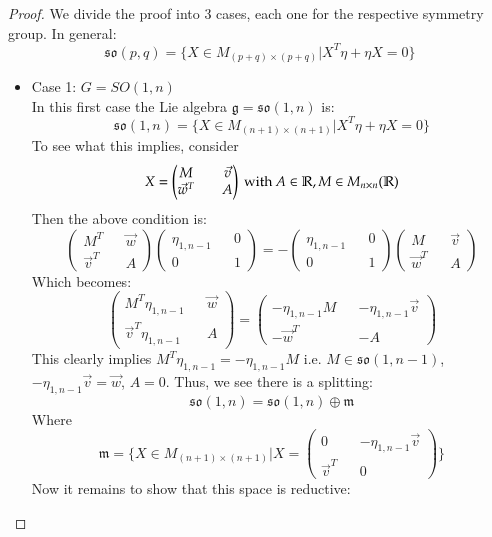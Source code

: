 \documentclass[12pt,a4paper]{report}
\theoremstyle{definition}
\theoremstyle{Theorem}
\theoremstyle{break}
\theoremstyle{definition}
\begin{document}
	\begin{proof}
		We divide the proof into 3 cases, each one for the respective symmetry group.
		In general:
		$$\mathfrak{so}(p,q)=\{X\in M_{(p+q)\times(p+q)}|X^T\eta+\eta X=0\}$$
		\begin{itemize}
			\item Case 1: $G=SO(1,n)$
			\\
			In this first case the Lie algebra $\mathfrak{g}=\mathfrak{so}(1,n)$ is:
			$$\mathfrak{so}(1,n)=\{X\in M_{(n+1)\times(n+1)}|X^T\eta+\eta X=0\}$$
			To see what this implies, consider
			$$X=\begin{pmatrix}
				M && \vec{v} \\
				\vec{w}^T && A
			\end{pmatrix}\hbox{ with }A\in\mathbb{R},M\in M_{n\times n}(\mathbb{R})$$
			Then the above condition is:
			$$\begin{pmatrix}
				M^T && \vec{w} \\
				\vec{v}^T && A
			\end{pmatrix}\begin{pmatrix}
			\eta_{1,n-1} && 0 \\
			0 && 1
			\end{pmatrix}=-\begin{pmatrix}
			\eta_{1,n-1} && 0 \\
			0 && 1
			\end{pmatrix}\begin{pmatrix}
			M && \vec{v} \\
			\vec{w}^T && A
			\end{pmatrix}$$
			Which becomes:
			$$\begin{pmatrix}
				M^T\eta_{1,n-1} && \vec{w} \\
				\vec{v}^T\eta_{1,n-1} && A
			\end{pmatrix}=\begin{pmatrix}
			-\eta_{1,n-1}M && -\eta_{1,n-1}\vec{v} \\
			-\vec{w}^T && -A
			\end{pmatrix}$$
			This clearly implies $M^T\eta_{1,n-1}=-\eta_{1,n-1}M$ i.e. $M\in \mathfrak{so}(1,n-1)$, $-\eta_{1,n-1}\vec{v}=\vec{w}$, $A=0$. Thus, we see there is a splitting:
			$$\mathfrak{so}(1,n)=\mathfrak{so}(1,n)\oplus \mathfrak{m}$$
			Where 
			$$\mathfrak{m}=\{X\in M_{(n+1)\times (n+1)}|X=\begin{pmatrix}
				0 && -\eta_{1,n-1}\vec{v} \\
				\vec{v}^T && 0
			\end{pmatrix}\}$$
			Now it remains to show that this space is reductive:

\end{itemize}
\end{proof}
\end{document}
